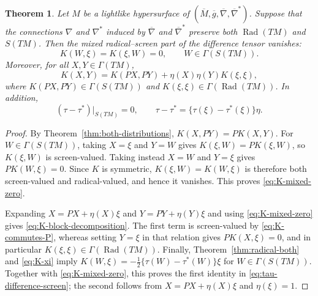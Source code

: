 \documentclass[10pt,a4paper]{amsart}
\newtheorem{theorem}{Theorem}[section]
\newcommand{\Rad}{\operatorname{Rad}}
\begin{document}
\begin{theorem}\label{thm:K-splitting}
Let $M$ be a lightlike hypersurface of
$(\overline{M},\overline{g},\overline{\nabla},\overline{\nabla}^{*})$.
Suppose that the connections $\nabla$ and $\nabla^{*}$ induced by
$\overline{\nabla}$ and $\overline{\nabla}^{*}$ preserve both
$\Rad(TM)$ and $S(TM)$. Then the mixed radical--screen part of the
difference tensor vanishes:
\begin{equation}\label{eq:K-mixed-zero}
K(W,\xi)=K(\xi,W)=0,
\qquad W\in\Gamma(S(TM)).
\end{equation}
Moreover, for all $X,Y\in\Gamma(TM)$,
\begin{equation}\label{eq:K-block-decomposition}
K(X,Y)=K(PX,PY)+\eta(X)\eta(Y)K(\xi,\xi),
\end{equation}
where $K(PX,PY)\in\Gamma(S(TM))$ and
$K(\xi,\xi)\in\Gamma(\Rad(TM))$. In addition,
\begin{equation}\label{eq:tau-difference-screen}
(\tau-\tau^{*})|_{S(TM)}=0,
\qquad
\tau-\tau^{*}=\{\tau(\xi)-\tau^{*}(\xi)\}\eta.
\end{equation}
\end{theorem}

\begin{proof}
By Theorem~\ref{thm:both-distributions},
$K(X,PY)=PK(X,Y)$. For $W\in\Gamma(S(TM))$, taking $X=\xi$ and
$Y=W$ gives $K(\xi,W)=PK(\xi,W)$, so $K(\xi,W)$ is screen-valued.
Taking instead $X=W$ and $Y=\xi$ gives $PK(W,\xi)=0$. Since $K$ is
symmetric, $K(\xi,W)=K(W,\xi)$ is therefore both screen-valued and
radical-valued, and hence it vanishes. This proves
\eqref{eq:K-mixed-zero}.

Expanding $X=PX+\eta(X)\xi$ and $Y=PY+\eta(Y)\xi$ and using
\eqref{eq:K-mixed-zero} gives \eqref{eq:K-block-decomposition}. The first
term is screen-valued by \eqref{eq:K-commutes-P}, whereas setting
$Y=\xi$ in that relation gives $PK(X,\xi)=0$, and in particular
$K(\xi,\xi)\in\Gamma(\Rad(TM))$. Finally, Theorem~\ref{thm:radical-both}
and \eqref{eq:K-xi} imply
$K(W,\xi)=-\frac12\{\tau(W)-\tau^{*}(W)\}\xi$ for
$W\in\Gamma(S(TM))$. Together with \eqref{eq:K-mixed-zero}, this proves
the first identity in \eqref{eq:tau-difference-screen}; the second follows
from $X=PX+\eta(X)\xi$ and $\eta(\xi)=1$.
\end{proof}
\end{document}
